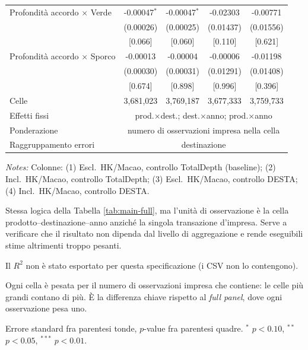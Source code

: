 \begin{table}[htbp]
\begin{threeparttable}
\begin{tabular}{lcccc}
\addlinespace
Profondit\`a accordo $\times$ Verde & -0.00047$^{*}$ & -0.00047$^{*}$ & -0.02303 & -0.00771 \\
 & (0.00026) & (0.00025) & (0.01437) & (0.01556) \\
 & [0.066] & [0.060] & [0.110] & [0.621] \\
\addlinespace
Profondit\`a accordo $\times$ Sporco & -0.00013 & -0.00004 & -0.00006 & -0.01198 \\
 & (0.00030) & (0.00031) & (0.01291) & (0.01408) \\
 & [0.674] & [0.898] & [0.996] & [0.396] \\
\addlinespace
\midrule
Celle & 3,681,023 & 3,769,187 & 3,677,333 & 3,759,733 \\
Effetti fissi & \multicolumn{4}{c}{prod.$\times$dest.; dest.$\times$anno; prod.$\times$anno} \\
Ponderazione & \multicolumn{4}{c}{numero di osservazioni impresa nella cella} \\
Raggruppamento errori & \multicolumn{4}{c}{destinazione} \\
\bottomrule
\end{tabular}
\begin{tablenotes}[flushleft]\footnotesize
\item \emph{Notes:} Colonne: (1) Escl.\ HK/Macao, controllo TotalDepth (baseline); (2) Incl.\ HK/Macao, controllo TotalDepth; (3) Escl.\ HK/Macao, controllo DESTA; (4) Incl.\ HK/Macao, controllo DESTA.
\item Stessa logica della Tabella \ref{tab:main-full}, ma l'unit\`a di osservazione \`e la cella prodotto--destinazione--anno anzich\'e la singola transazione d'impresa. Serve a verificare che il risultato non dipenda dal livello di aggregazione e rende eseguibili stime altrimenti troppo pesanti.
\item Il $R^2$ non \`e stato esportato per questa specificazione (i CSV non lo contengono).
\item Ogni cella \`e pesata per il numero di osservazioni impresa che contiene: le celle pi\`u grandi contano di pi\`u. \`E la differenza chiave rispetto al \emph{full panel}, dove ogni osservazione pesa uno.
\item Errore standard fra parentesi tonde, $p$-value fra parentesi quadre. $^{*}$ $p<0.10$, $^{**}$ $p<0.05$, $^{***}$ $p<0.01$.
\end{tablenotes}
\end{threeparttable}
\end{table}
